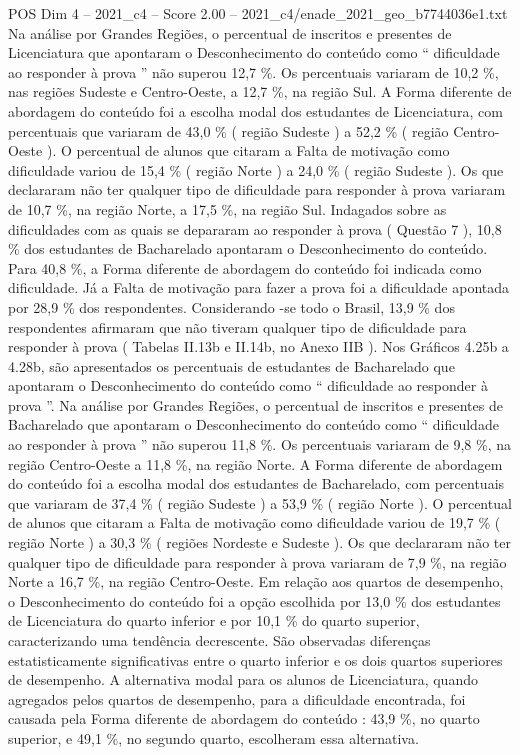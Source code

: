 \begin{textsample}{POS Dim 4 – 2021\_c4 – Score 2.00 – 2021\_c4/enade\_2021\_geo\_b7744036e1.txt}
Na análise por Grandes Regiões, o percentual de inscritos e presentes de Licenciatura que apontaram o Desconhecimento do conteúdo como “ dificuldade ao responder à prova ” não superou 12,7 \%.
Os percentuais variaram de 10,2 \%, nas regiões Sudeste e Centro-Oeste, a 12,7 \%, na região Sul.
A Forma diferente de abordagem do conteúdo foi a escolha modal dos estudantes de Licenciatura, com percentuais que variaram de 43,0 \% ( região Sudeste ) a 52,2 \% ( região Centro-Oeste ).
O percentual de alunos que citaram a Falta de motivação como dificuldade variou de 15,4 \% ( região Norte ) a 24,0 \% ( região Sudeste ).
Os que declararam não ter qualquer tipo de dificuldade para responder à prova variaram de 10,7 \%, na região Norte, a 17,5 \%, na região Sul.
Indagados sobre as dificuldades com as quais se depararam ao responder à prova ( Questão 7 ), 10,8 \% dos estudantes de Bacharelado apontaram o Desconhecimento do conteúdo.
Para 40,8 \%, a Forma diferente de abordagem do conteúdo foi indicada como dificuldade.
Já a Falta de motivação para fazer a prova foi a dificuldade apontada por 28,9 \% dos respondentes.
Considerando -se todo o Brasil, 13,9 \% dos respondentes afirmaram que não tiveram qualquer tipo de dificuldade para responder à prova ( Tabelas II.13b e II.14b, no Anexo IIB ).
Nos Gráficos 4.25b a 4.28b, são apresentados os percentuais de estudantes de Bacharelado que apontaram o Desconhecimento do conteúdo como “ dificuldade ao responder à prova ”.
Na análise por Grandes Regiões, o percentual de inscritos e presentes de Bacharelado que apontaram o Desconhecimento do conteúdo como “ dificuldade ao responder à prova ” não superou 11,8 \%.
Os percentuais variaram de 9,8 \%, na região Centro-Oeste a 11,8 \%, na região Norte.
A Forma diferente de abordagem do conteúdo foi a escolha modal dos estudantes de Bacharelado, com percentuais que variaram de 37,4 \% ( região Sudeste ) a 53,9 \% ( região Norte ).
O percentual de alunos que citaram a Falta de motivação como dificuldade variou de 19,7 \% ( região Norte ) a 30,3 \% ( regiões Nordeste e Sudeste ).
Os que declararam não ter qualquer tipo de dificuldade para responder à prova variaram de 7,9 \%, na região Norte a 16,7 \%, na região Centro-Oeste.
Em relação aos quartos de desempenho, o Desconhecimento do conteúdo foi a opção escolhida por 13,0 \% dos estudantes de Licenciatura do quarto inferior e por 10,1 \% do quarto superior, caracterizando uma tendência decrescente.
São observadas diferenças estatisticamente significativas entre o quarto inferior e os dois quartos superiores de desempenho.
A alternativa modal para os alunos de Licenciatura, quando agregados pelos quartos de desempenho, para a dificuldade encontrada, foi causada pela Forma diferente de abordagem do conteúdo : 43,9 \%, no quarto superior, e 49,1 \%, no segundo quarto, escolheram essa alternativa.

\end{textsample}
